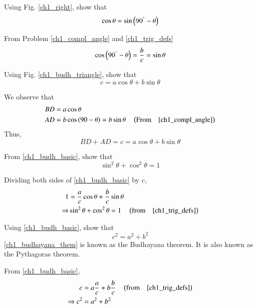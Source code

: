 \begin{problem}
	Using Fig. \ref{ch1_right}, show that
	\begin{equation}
	\cos \theta = \sin \left(90^{\degree} - \theta\right)
	\end{equation}
\end{problem}
\proof From Problem \ref{ch1_compl_angle} and  \eqref{ch1_trig_defs}
%
\begin{equation}
	\cos \left(90^{\degree}-\theta\right) = \frac{b}{c} = \sin \theta
\end{equation}
%
\begin{problem}
Using Fig. \ref{ch1_budh_triangle}, show that 
%
\begin{equation}
\label{ch1_budh_basic}
c = a \cos \theta + b \sin \theta
\end{equation}
%
\end{problem}
\proof We observe that
%
\begin{align}
BD &= a \cos \theta \\
AD &= b \cos\left(90-\theta\right) = b \sin \theta \quad \left(\text{From} \quad \eqref{ch1_compl_angle}\right)
\end{align}
%
Thus,
\begin{equation}
BD + AD = c = a \cos \theta + b \sin \theta
\end{equation}
\begin{problem}
From \eqref{ch1_budh_basic}, show that
%
\begin{equation}
\sin ^2 \theta + \cos ^2 \theta = 1
\end{equation}

\end{problem}
%
\proof Dividing both sides of \eqref{ch1_budh_basic} by $c$, 
\begin{align}
1 &= \frac{a}{c}\cos\theta + \frac{b}{c}\sin\theta\\
\Rightarrow &\sin ^2 \theta + \cos ^2 \theta = 1 \quad \left(\text{from} \quad \eqref{ch1_trig_defs}\right)
\end{align}

\begin{problem}
	Using \eqref{ch1_budh_basic}, show that
	\begin{equation}
	\label{ch1_budhayana_them}
	c^2 = a^2 + b^2
	\end{equation}
	\eqref{ch1_budhayana_them} is known as the Budhayana theorem.  It is also known as the Pythagoras theorem.
\end{problem}
\proof From \eqref{ch1_budh_basic},
\begin{align}
c &= a\frac{a}{c} + b \frac{b}{c} \quad \left(\text{from} \quad \eqref{ch1_trig_defs}\right)\\
\Rightarrow c^2 &= a^2 + b^2
\end{align}


